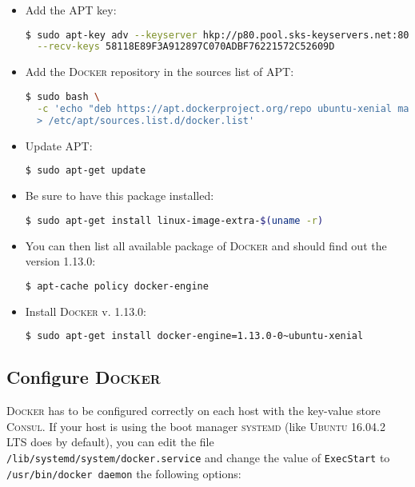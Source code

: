 \begin{itemize}
  \item
    Add the APT key:
    \begin{lstlisting}[language=bash, basicstyle=\small]
$ sudo apt-key adv --keyserver hkp://p80.pool.sks-keyservers.net:80 \
  --recv-keys 58118E89F3A912897C070ADBF76221572C52609D
    \end{lstlisting}
  \item
    Add the \textsc{Docker} repository in the sources list of APT:
    \begin{lstlisting}[language=bash, basicstyle=\small]
$ sudo bash \
  -c 'echo "deb https://apt.dockerproject.org/repo ubuntu-xenial main" \
  > /etc/apt/sources.list.d/docker.list'
    \end{lstlisting}
  \item
    Update APT:
    \begin{lstlisting}[language=bash, basicstyle=\small]
$ sudo apt-get update
    \end{lstlisting}
  \item
    Be sure to have this package installed:
    \begin{lstlisting}[language=bash, basicstyle=\small]
$ sudo apt-get install linux-image-extra-$(uname -r)
    \end{lstlisting}
  \item
    You can then list all available package of \textsc{Docker} and should find out the version 1.13.0:
    \begin{lstlisting}[language=bash, basicstyle=\small]
$ apt-cache policy docker-engine
    \end{lstlisting}
  \item
    Install \textsc{Docker} v. 1.13.0:
    \begin{lstlisting}[language=bash, basicstyle=\small]
$ sudo apt-get install docker-engine=1.13.0-0~ubuntu-xenial
    \end{lstlisting}
\end{itemize}

\newpage

\subsection{Configure \textsc{Docker}}
\label{subsec:docker_config}

\textsc{Docker} has to be configured correctly on each host with the key-value store \textsc{Consul}.
If your host is using the boot manager \textsc{systemd} (like \textsc{Ubuntu 16.04.2 LTS} does by default), you can edit the file \texttt{/lib/systemd/system/docker.service} and change the value of \texttt{ExecStart} to \texttt{/usr/bin/docker daemon} the following options:

